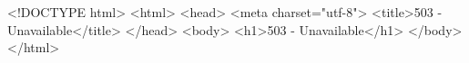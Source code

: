 <!DOCTYPE html>
<html>
<head>
	<meta charset="utf-8">
	<title>503 - Unavailable</title>
</head>
<body>
	<h1>503 - Unavailable</h1>
</body>
</html>
